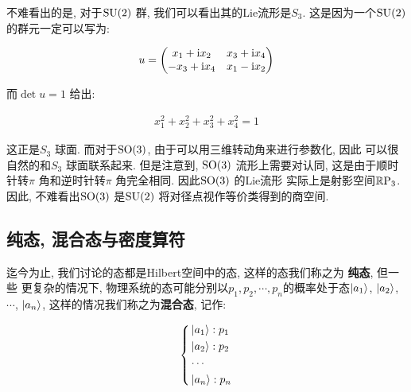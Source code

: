 \begin{remark}
  不难看出的是, 对于${\rm SU}(2)$ 群, 我们可以看出其的Lie流形是$S_3$.
  这是因为一个${\rm SU}(2)$ 的群元一定可以写为:

  \begin{equation}
    \begin{aligned}
      u =
      \begin{pmatrix}
        x_1 + {\rm i} x_2 & x_3 + {\rm i} x_4 \\
        -x_3 + {\rm i} x_4 & x_1 - {\rm i} x_2
      \end{pmatrix}
    \end{aligned}
  \end{equation}

  而$\det u=1$ 给出:
  
  \begin{equation}
    \begin{aligned}
      x_1^{2} + x_2^{2} + x_3^{2} + x_4^{2} = 1
    \end{aligned}
  \end{equation}

  这正是$S_3$ 球面. 而对于${\rm SO}(3)$, 由于可以用三维转动角来进行参数化, 因此
  可以很自然的和$S_3$ 球面联系起来. 但是注意到, ${\rm SO}(3)$ 流形上需要对认同,
  这是由于顺时针转$\pi$ 角和逆时针转$\pi$ 角完全相同. 因此${\rm SO}(3)$ 的Lie流形
  实际上是射影空间${\rm \mathbb{R}P}_3$. 因此, 不难看出${\rm SO}(3)$ 是${\rm SU}(2)$ 
  将对径点视作等价类得到的商空间.

\end{remark}

\subsection{纯态, 混合态与密度算符}

迄今为止, 我们讨论的态都是Hilbert空间中的态, 这样的态我们称之为 {\bf 纯态}, 但一些
更复杂的情况下, 物理系统的态可能分别以$p_1, p_2, \cdots, p_{n}$的概率处于态$\ket{a_1}$, $\ket{a_2}$,$\cdots$, $\ket{a_{n}}$,
这样的情况我们称之为{\bf 混合态}, 记作:

\begin{equation}
  \left\{
    \begin{aligned}
      &\ket{a_1}: p_1 \\
      &\ket{a_2}: p_2 \\
      &\cdots \\
      &\ket{a_n}: p_{n}
    \end{aligned}
  \right.
\end{equation}

